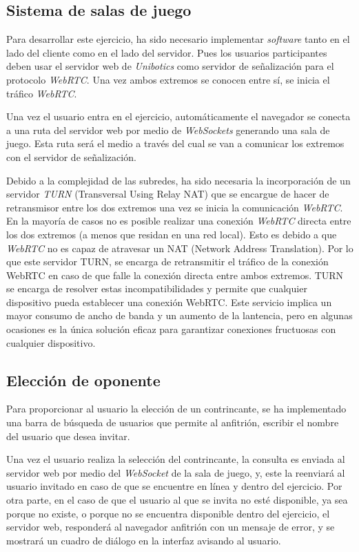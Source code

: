 \documentclass[a4paper, 12pt]{book}
\begin{document}
\subsection{Sistema de salas de juego}

Para desarrollar este ejercicio, ha sido necesario implementar \emph{software} tanto en el lado del cliente como en el lado del servidor. Pues los usuarios participantes deben usar el servidor web de \emph{Unibotics} como servidor de señalización para el protocolo \emph{WebRTC}. Una vez ambos extremos se conocen entre sí, se inicia el tráfico \emph{WebRTC}.

Una vez el usuario entra en el ejercicio, automáticamente el navegador se conecta a una ruta del servidor web por medio de \emph{WebSockets} generando una sala de juego. Esta ruta será el medio a través del cual se van a comunicar los extremos con el servidor de señalización.

Debido a la complejidad de las subredes, ha sido necesaria la incorporación de un servidor \emph{TURN} (Transversal Using Relay NAT) que se encargue de hacer de retransmisor entre los dos extremos una vez se inicia la comunicación \emph{WebRTC}. En la mayoría de casos no es posible realizar una conexión \emph{WebRTC} directa entre los dos extremos (a menos que residan en una red local). Esto es debido a que \emph{WebRTC} no es capaz de atravesar un NAT (Network Address Translation). Por lo que este servidor TURN, se encarga de retransmitir el tráfico de la conexión WebRTC en caso de que falle la conexión directa entre ambos extremos. TURN se encarga de resolver estas incompatibilidades y permite que cualquier dispositivo pueda establecer una conexión WebRTC. Este servicio implica un mayor consumo de ancho de banda y un aumento de la lantencia, pero en algunas ocasiones es la única solución eficaz para garantizar conexiones fructuosas con cualquier dispositivo.

\subsection{Elección de oponente}
\label{sec:follow_line_game_sync_oponente_chat}

Para proporcionar al usuario la elección de un contrincante, se ha implementado una barra de búsqueda de usuarios que permite al anfitrión, escribir el nombre del usuario que desea invitar.

Una vez el usuario realiza la selección del contrincante, la consulta es enviada al servidor web por medio del \emph{WebSocket} de la sala de juego, y, este la reenviará al usuario invitado en caso de que se encuentre en línea y dentro del ejercicio. Por otra parte, en el caso de que el usuario al que se invita no esté disponible, ya sea porque no existe, o porque no se encuentra disponible dentro del ejercicio, el servidor web, responderá al navegador anfitrión con un mensaje de error, y se mostrará un cuadro de diálogo en la interfaz avisando al usuario.
\end{document}
